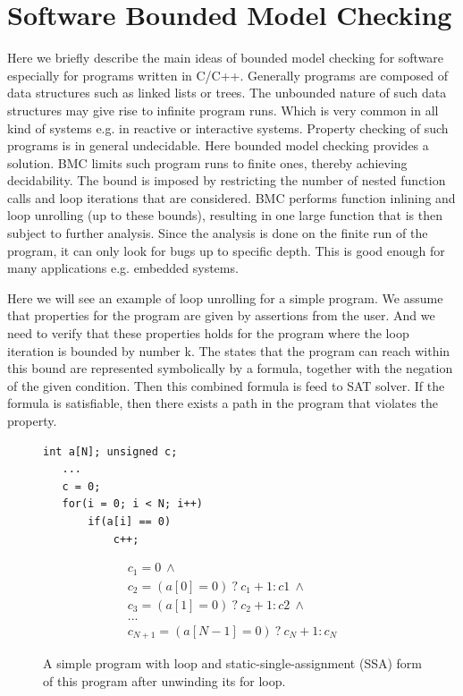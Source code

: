 \documentclass[14pt]{article}
\begin{document}
{\section{Software Bounded Model Checking}\label{Software Bounded Model Checking}
Here we briefly describe the main ideas of bounded model checking for software especially for programs written in C/C++. Generally programs are composed of data structures such as linked lists or trees. The unbounded nature of such data structures may give rise to infinite program runs. Which is very common in all kind of systems e.g. in reactive or interactive systems. Property checking of such programs is in general undecidable. Here bounded model checking provides a solution. BMC limits such program runs to finite ones, thereby achieving decidability. The bound is imposed by restricting the number of nested function calls and loop iterations that are considered. BMC performs function inlining and loop unrolling (up to these bounds), resulting in one large function that is then subject to further analysis. Since the analysis is done on the finite run of the program, it  can only look for bugs up to specific depth. This is good enough for many applications e.g. embedded systems. 

Here we will see an example of loop unrolling for a simple program. We assume that properties for the program are given by assertions from  the user. And we need to verify that these properties holds for the program where the loop iteration is bounded by number k. The states that the program can reach within this bound are represented symbolically by a formula, together with the negation of the given condition. Then this combined formula is feed to SAT solver. If the formula is satisfiable, then there exists a path in the program that violates the property. 

\begin{figure}[ht]
\centering
\begin{minipage}[t]{0.45\linewidth}
\begin{lstlisting}
int a[N]; unsigned c;
   ...
   c = 0;
   for(i = 0; i < N; i++)
       if(a[i] == 0)
           c++;
\end{lstlisting}
\end{minipage}
\quad
\begin{minipage}[t]{0.45\linewidth}
\begin{gather*}
c_1 = 0 \  \wedge\\
c_2 = (a[0] = 0) \ ?\  c_1 + 1 : c1 \ \wedge\\
c_3 = (a[1] = 0)\  ?\  c_2 + 1 : c2 \ \wedge\\
...\\
c_{N+1} = (a[N-1] = 0) \ ?\  c_N + 1 : c_N
\end{gather*}
\end{minipage}
\caption{A simple program with loop and static-single-assignment (SSA) form of this program after unwinding its for loop.}
\end{figure}






}
\end{document}
